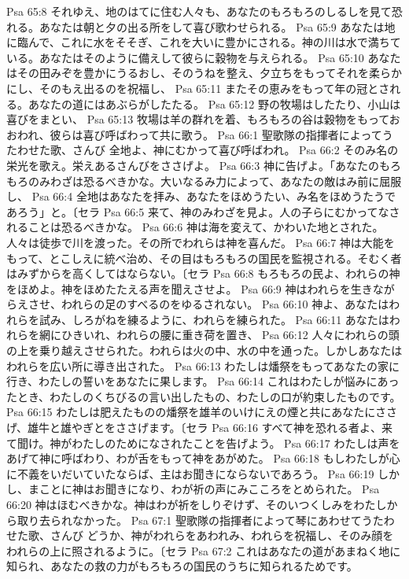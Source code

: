Psa 65:8  それゆえ、地のはてに住む人々も、あなたのもろもろのしるしを見て恐れる。あなたは朝と夕の出る所をして喜び歌わせられる。
Psa 65:9  あなたは地に臨んで、これに水をそそぎ、これを大いに豊かにされる。神の川は水で満ちている。あなたはそのように備えして彼らに穀物を与えられる。
Psa 65:10  あなたはその田みぞを豊かにうるおし、そのうねを整え、夕立ちをもってそれを柔らかにし、そのもえ出るのを祝福し、
Psa 65:11  またその恵みをもって年の冠とされる。あなたの道にはあぶらがしたたる。
Psa 65:12  野の牧場はしたたり、小山は喜びをまとい、
Psa 65:13  牧場は羊の群れを着、もろもろの谷は穀物をもっておおわれ、彼らは喜び呼ばわって共に歌う。
Psa 66:1  聖歌隊の指揮者によってうたわせた歌、さんび 全地よ、神にむかって喜び呼ばわれ。
Psa 66:2  そのみ名の栄光を歌え。栄えあるさんびをささげよ。
Psa 66:3  神に告げよ。「あなたのもろもろのみわざは恐るべきかな。大いなるみ力によって、あなたの敵はみ前に屈服し、
Psa 66:4  全地はあなたを拝み、あなたをほめうたい、み名をほめうたうであろう」と。〔セラ
Psa 66:5  来て、神のみわざを見よ。人の子らにむかってなされることは恐るべきかな。
Psa 66:6  神は海を変えて、かわいた地とされた。人々は徒歩で川を渡った。その所でわれらは神を喜んだ。
Psa 66:7  神は大能をもって、とこしえに統べ治め、その目はもろもろの国民を監視される。そむく者はみずからを高くしてはならない。〔セラ
Psa 66:8  もろもろの民よ、われらの神をほめよ。神をほめたたえる声を聞えさせよ。
Psa 66:9  神はわれらを生きながらえさせ、われらの足のすべるのをゆるされない。
Psa 66:10  神よ、あなたはわれらを試み、しろがねを練るように、われらを練られた。
Psa 66:11  あなたはわれらを網にひきいれ、われらの腰に重き荷を置き、
Psa 66:12  人々にわれらの頭の上を乗り越えさせられた。われらは火の中、水の中を通った。しかしあなたはわれらを広い所に導き出された。
Psa 66:13  わたしは燔祭をもってあなたの家に行き、わたしの誓いをあなたに果します。
Psa 66:14  これはわたしが悩みにあったとき、わたしのくちびるの言い出したもの、わたしの口が約束したものです。
Psa 66:15  わたしは肥えたものの燔祭を雄羊のいけにえの煙と共にあなたにささげ、雄牛と雄やぎとをささげます。〔セラ
Psa 66:16  すべて神を恐れる者よ、来て聞け。神がわたしのためになされたことを告げよう。
Psa 66:17  わたしは声をあげて神に呼ばわり、わが舌をもって神をあがめた。
Psa 66:18  もしわたしが心に不義をいだいていたならば、主はお聞きにならないであろう。
Psa 66:19  しかし、まことに神はお聞きになり、わが祈の声にみこころをとめられた。
Psa 66:20  神はほむべきかな。神はわが祈をしりぞけず、そのいつくしみをわたしから取り去られなかった。
Psa 67:1  聖歌隊の指揮者によって琴にあわせてうたわせた歌、さんび どうか、神がわれらをあわれみ、われらを祝福し、そのみ顔をわれらの上に照されるように。〔セラ
Psa 67:2  これはあなたの道があまねく地に知られ、あなたの救の力がもろもろの国民のうちに知られるためです。
